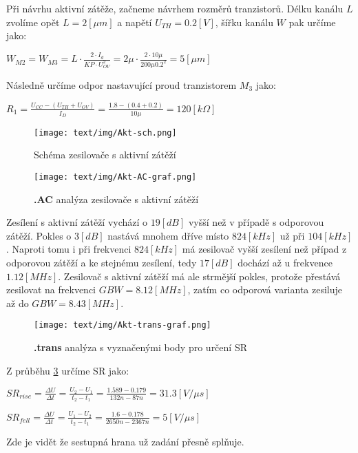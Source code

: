 Při návrhu aktivní zátěže, začneme návrhem rozměrů tranzistorů.
Délku kanálu \(L\) zvolíme opět \(L = 2 [\mu m]\) a napětí \(U_{TH} = 0.2 [V]\), šířku kanálu \(W\) pak určíme jako:

\begin{center}
    \large
    \(
        W_{M2} = W_{M3} = L \cdot \frac{2 \cdot I_d}{KP \cdot U_{OV}^2} = 2\mu \cdot \frac{2 \cdot 10\mu}{200\mu 0.2^2} = 5 [\mu m]
    \)
\end{center}

Následně určíme odpor nastavující proud tranzistorem \(M_3\) jako:

\begin{center}
    \large
    \(
        R_{1} = \frac{U_{CC} - (U_{TH} + U_{OV})}{I_D} = \frac{1.8-(0.4+0.2)}{10\mu} = 120 [k\Omega] 
    \)
\end{center}

\vspace{10mm}
\begin{figure}[h!]
    \centering
    \texttt{[image: text/img/Akt-sch.png]}
    \caption{\label{fig:Akt-sch} Schéma zesilovače s aktivní zátěží}
\end{figure}

\vspace{10mm}
\begin{figure}[h!]
    \centering
    \texttt{[image: text/img/Akt-AC-graf.png]}
    \caption{\label{fig:Akt-AC} {\bf .AC} analýza zesilovače s aktivní zátěží}
\end{figure}

Zesílení s aktivní zátěží vychází o \(19 [dB]\) vyšší než v případě s odporovou zátěží.
Pokles o \(3 [dB]\) nastává mnohem dříve místo \(824 [kHz]\) už při \(104 [kHz]\).
Naproti tomu i při frekvenci \(824 [kHz]\) má zesilovač vyšší zesílení než případ z odporovou zátěží a ke stejnému zesílení, tedy \(17 [dB]\) dochází až u frekvence \(1.12 [MHz]\).
Zesilovač s aktivní zátěží má ale strmější pokles, protože přestává zesilovat na frekvenci \(GBW = 8.12 [MHz]\), zatím co odporová varianta zesiluje až do \(GBW = 8.43 [MHz]\).

\vspace{10mm}
\begin{figure}[h!]
    \centering
    \texttt{[image: text/img/Akt-trans-graf.png]}
    \caption{\label{fig:res-SR} {\bf .trans} analýza s vyznačenými body pro určení SR}
\end{figure}

Z průběhu \ref{fig:res-SR} určíme SR jako:
\begin{center}
    \Large
    \(
        SR_{rise} = \frac{\Delta U}{\Delta t} = \frac{U_2 - U_1}{t_2 - t_1} = \frac{1.589 - 0.179}{132n - 87n} = 31.3 [V/\mu s]
    \)

    \(
        SR_{fell} = \frac{\Delta U}{\Delta t} = \frac{U_1 - U_2}{t_2 - t_1} = \frac{1.6 - 0.178}{2650n - 2367n} = 5 [V/\mu s]
    \)
\end{center}

Zde je vidět že sestupná hrana už zadání přesně splňuje.
